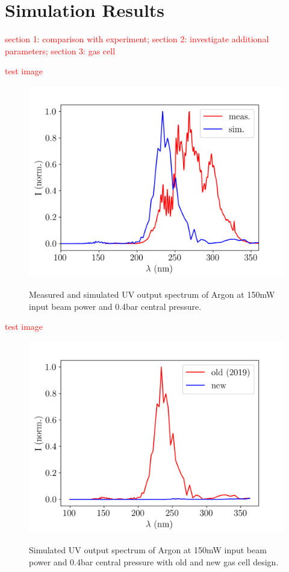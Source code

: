 \documentclass[a4paper]{jpconf}
\begin{document}
\section{Simulation Results}

\textcolor{red}{section 1: comparison with experiment; section 2: investigate additional parameters; section 3: gas cell}

\textcolor{red}{test image}
\begin{center}
\begin{figure}
\includegraphics[scale=0.5]{im/Ar_prelim_sim_v_measured}\label{im:sim_v_measured}
\caption{Measured and simulated UV output spectrum of Argon at 150mW input beam power and 0.4bar central pressure.}
\end{figure}
\end{center}

\textcolor{red}{test image}
\begin{center}
\begin{figure}
\includegraphics[scale=0.5]{im/Ar_prelim_old_vs_new}\label{im:old_v_new}
\caption{Simulated UV output spectrum of Argon at 150mW input beam power and 0.4bar central pressure with old and new gas cell design.}
\end{figure}
\end{center}
\end{document}
